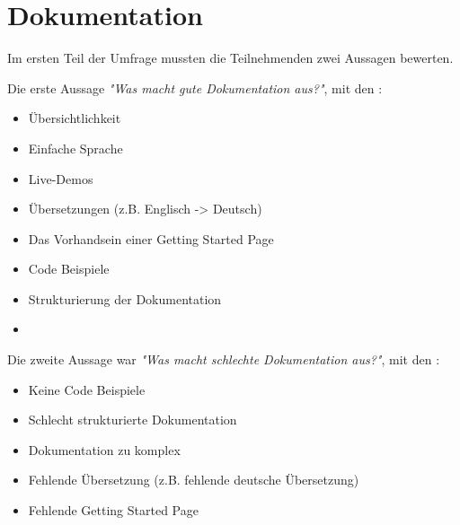 \section{Dokumentation}

Im ersten Teil der Umfrage mussten die Teilnehmenden zwei Aussagen bewerten.


\bigskip
\noindent
Die erste Aussage \textit{"Was macht gute Dokumentation aus?"}, mit den :
\begin{multicols}{2}
    \begin{itemize}
        \setlength\itemsep{0em}
        \item Übersichtlichkeit
        \item Einfache Sprache
        \item Live-Demos
        \item Übersetzungen (z.B. Englisch -> Deutsch)
        \item Das Vorhandsein einer Getting Started Page
        \item Code Beispiele
        \item Strukturierung der Dokumentation
        \item []
    \end{itemize}
\end{multicols}

\bigskip
\noindent
Die zweite Aussage war \textit{"Was macht schlechte Dokumentation aus?"}, mit den :

\begin{multicols}{2}
    \begin{itemize}
        \setlength\itemsep{0em}
        \item Keine Code Beispiele
        \item Schlecht strukturierte Dokumentation
        \item Dokumentation zu komplex
        \item Fehlende Übersetzung (z.B. fehlende deutsche Übersetzung)
        \item Fehlende Getting Started Page
    \end{itemize}
\end{multicols}



